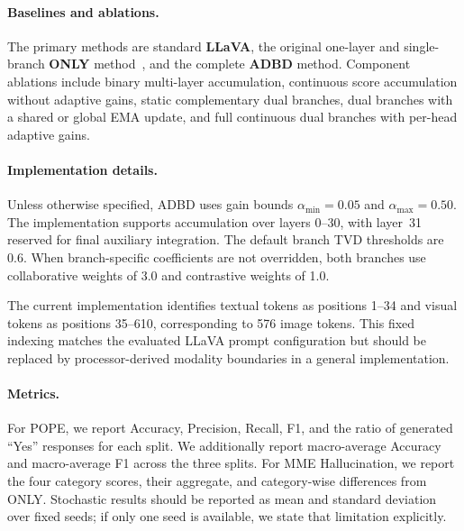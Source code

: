 \paragraph{Baselines and ablations.}
The primary methods are standard \textbf{LLaVA}, the original one-layer and single-branch \textbf{ONLY} method~\cite{wan2025only}, and the complete \textbf{ADBD} method. Component ablations include binary multi-layer accumulation, continuous score accumulation without adaptive gains, static complementary dual branches, dual branches with a shared or global EMA update, and full continuous dual branches with per-head adaptive gains.

\paragraph{Implementation details.}
Unless otherwise specified, ADBD uses gain bounds $\alpha_{\min}=0.05$ and $\alpha_{\max}=0.50$. The implementation supports accumulation over layers 0--30, with layer~31 reserved for final auxiliary integration. The default branch TVD thresholds are 0.6. When branch-specific coefficients are not overridden, both branches use collaborative weights of 3.0 and contrastive weights of 1.0. 

The current implementation identifies textual tokens as positions 1--34 and visual tokens as positions 35--610, corresponding to 576 image tokens. This fixed indexing matches the evaluated LLaVA prompt configuration but should be replaced by processor-derived modality boundaries in a general implementation.

\paragraph{Metrics.}
For POPE, we report Accuracy, Precision, Recall, F1, and the ratio of generated ``Yes'' responses for each split. We additionally report macro-average Accuracy and macro-average F1 across the three splits. For MME Hallucination, we report the four category scores, their aggregate, and category-wise differences from ONLY. Stochastic results should be reported as mean and standard deviation over fixed seeds; if only one seed is available, we state that limitation explicitly.

